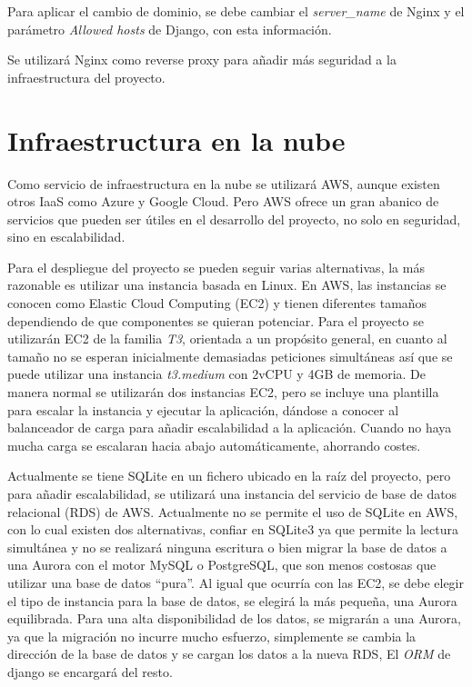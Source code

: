 Para aplicar el cambio de dominio, se debe cambiar el \textit{server\_name} de Nginx y el parámetro \textit{Allowed hosts} de Django, con esta información.

Se utilizará Nginx como reverse proxy para añadir más seguridad a la infraestructura del proyecto.

\section{Infraestructura en la nube}
Como servicio de infraestructura en la nube se utilizará \gls{AWS}, aunque existen otros \gls{IaaS} como Azure y Google Cloud. Pero \gls{AWS} ofrece un gran abanico de servicios que pueden ser útiles en el desarrollo del proyecto, no solo en seguridad, sino en escalabilidad. 

Para el despliegue del proyecto se pueden seguir varias alternativas, la más razonable es utilizar una instancia basada en Linux. En \gls{AWS}, las instancias se conocen como Elastic Cloud Computing (\gls{EC2}) y tienen diferentes tamaños dependiendo de que componentes se quieran potenciar. Para el proyecto se utilizarán \gls{EC2} de la familia \textit{T3}, orientada a un propósito general, en cuanto al tamaño no se esperan inicialmente demasiadas peticiones simultáneas así que se puede utilizar una instancia \textit{t3.medium} con 2vCPU y 4GB de memoria. De manera normal se utilizarán dos instancias \gls{EC2}, pero se incluye una plantilla para escalar la instancia y ejecutar la aplicación, dándose a conocer al balanceador de carga para añadir escalabilidad a la aplicación. Cuando no haya mucha carga se escalaran hacia abajo automáticamente, ahorrando costes.

Actualmente se tiene SQLite en un fichero ubicado en la raíz del proyecto, pero para añadir escalabilidad, se utilizará una instancia del servicio de base de datos relacional (\gls{RDS}) de \gls{AWS}. Actualmente no se permite el uso de SQLite en \gls{AWS}, con lo cual existen dos alternativas, confiar en SQLite3 ya que permite la lectura simultánea y no se realizará ninguna escritura o bien migrar la base de datos a una Aurora con el motor MySQL o PostgreSQL, que son menos costosas que utilizar una base de datos ``pura''. Al igual que ocurría con las \gls{EC2}, se debe elegir el tipo de instancia para la base de datos, se elegirá la más pequeña, una Aurora equilibrada. Para una alta disponibilidad de los datos, se migrarán a una Aurora, ya que la migración no incurre mucho esfuerzo, simplemente se cambia la dirección de la base de datos y se cargan los datos a la nueva \gls{RDS}, El \textit{\gls{ORM}} de \Gls{django} se encargará del resto.

